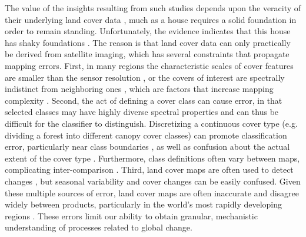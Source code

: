 \documentclass[a4paper]{article}
\begin{document}
The value of the insights resulting from such studies depends upon the veracity of their underlying land cover data \citep{verburg_challenges_2011}, much as a house requires a solid foundation in order to remain standing. Unfortunately, the evidence indicates that this house has shaky foundations \citep[e.g.][]{fritz_highlighting_2011}. The reason is that land cover data can only practically be derived from satellite imaging, which has several constraints that propagate mapping errors. First, in many regions the characteristic scales of cover features are smaller than the sensor resolution \citep[e.g. smallholders' fields][]{jain_mapping_2013,debats_generalized_2016,ozdogan_resolution_2006}, or the covers of interest are spectrally indistinct from neighboring ones \citep{sweeney_mapping_2015,fritz_identifying_2008}, which are factors that increase mapping complexity \citep{yu_meta-discoveries_2014}. Second, the act of defining a cover class can cause error, in that selected classes may have highly diverse spectral properties \citep[e.g. croplands or savannas;][]{fritz_identifying_2008,verburg_challenges_2011,debats_generalized_2016} and can thus be difficult for the classifier to distinguish. Discretizing a continuous cover type (e.g. dividing a forest into different canopy cover classes) can promote classification error, particularly near class boundaries \citep{foody_status_2002}, as well as confusion about the actual extent of the cover type \citep{sexton_conservation_2015}. Furthermore, class definitions often vary between maps, complicating inter-comparison \citep{kuemmerle_challenges_2013,fritz_identifying_2008}. Third, land cover maps are often used to detect changes \citep[e.g.][]{gross_monitoring_2013}, but seasonal variability and cover changes can be easily confused. Given these multiple sources of error, land cover maps are often inaccurate and disagree widely between products, particularly in the world's most rapidly developing regions \citep{fritz_comparison_2010,fritz_cropland_2011,fritz_need_2013}. These errors limit our ability to obtain granular, mechanistic understanding of processes related to global change. 
\end{document}
